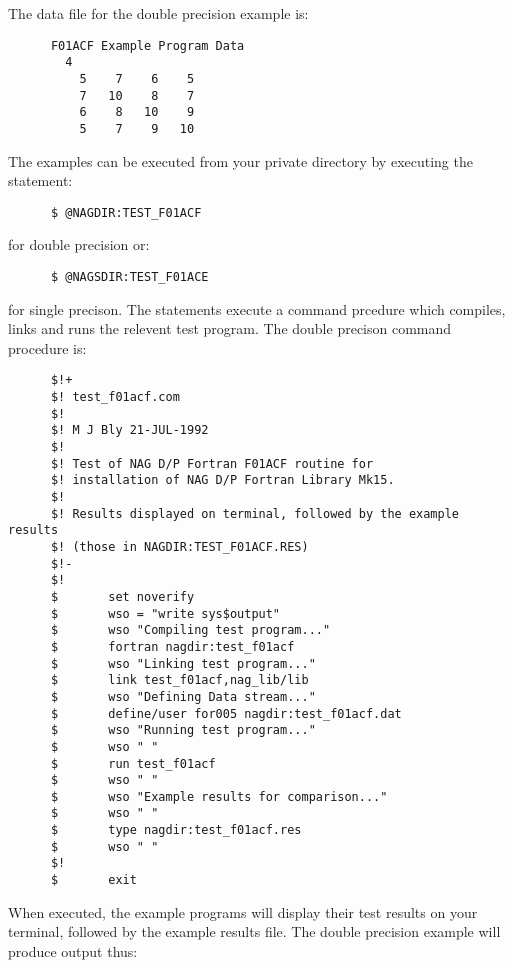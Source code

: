 The data file for the double precision example is:

\begin{small}
\begin{verbatim}
      F01ACF Example Program Data
        4
          5    7    6    5
          7   10    8    7
          6    8   10    9
          5    7    9   10
\end{verbatim}
\end{small}

The examples can be executed from your private directory by executing the
statement:
\begin{verbatim}
      $ @NAGDIR:TEST_F01ACF
\end{verbatim}
for double precision or:
\begin{verbatim}
      $ @NAGSDIR:TEST_F01ACE
\end{verbatim}
for single precison. The statements execute a command prcedure which compiles,
links and runs the relevent test program. The double precison command procedure
is:

\begin{small}
\begin{verbatim}
      $!+
      $! test_f01acf.com
      $!
      $! M J Bly 21-JUL-1992
      $!
      $! Test of NAG D/P Fortran F01ACF routine for
      $! installation of NAG D/P Fortran Library Mk15.
      $!
      $! Results displayed on terminal, followed by the example results
      $! (those in NAGDIR:TEST_F01ACF.RES)
      $!-
      $!
      $       set noverify
      $       wso = "write sys$output"
      $       wso "Compiling test program..."
      $       fortran nagdir:test_f01acf
      $       wso "Linking test program..."
      $       link test_f01acf,nag_lib/lib
      $       wso "Defining Data stream..."
      $       define/user for005 nagdir:test_f01acf.dat
      $       wso "Running test program..."
      $       wso " "
      $       run test_f01acf
      $       wso " "
      $       wso "Example results for comparison..."
      $       wso " "
      $       type nagdir:test_f01acf.res
      $       wso " "
      $!
      $       exit
\end{verbatim}
\end{small}

When executed, the example programs will display their test results on your
terminal, followed by the example results file. The double precision example
will produce output thus:

